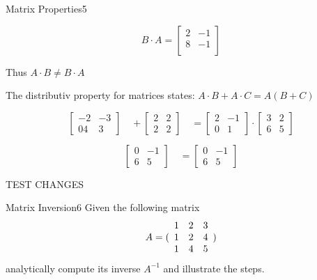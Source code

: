 \begin{questions}
\begin{question}{Matrix Properties}{5}
\begin{answer}
\begin{equation}
B \cdot A = \begin{bmatrix}
2 & -1 \\
8 & -1\\
\end{bmatrix}
\end{equation}

Thus $A \cdot B \neq B \cdot A$

The distributiv property for matrices states: $A\cdot B + A\cdot C = A (B+C)$ 


\[
\begin{bmatrix}
-2 & -3  \\
04 &  3 
\end{bmatrix}\quad
+
\begin{bmatrix}
2 & 2  \\
2 & 2 
\end{bmatrix}\quad
=
\begin{bmatrix}
2 & -1  \\
0 & 1 
\end{bmatrix}
\cdot
\begin{bmatrix}
3 & 2  \\
6 & 5
\end{bmatrix}
\]

\[
\begin{bmatrix}
0 & -1  \\
6 & 5 
\end{bmatrix}\quad
=
\begin{bmatrix}
0 & -1  \\
6 & 5
\end{bmatrix}
\]


TEST CHANGES

\end{answer}

\end{question}


\begin{question}{Matrix Inversion}{6}
Given the following matrix 
\begin{equation*}
     A = ( \begin{array}{c c c} 
     1 & 2 & 3 \\
     1 & 2 & 4 \\
     1 & 4 & 5 \end{array} )
\end{equation*}
analytically compute its inverse $ A^{-1}$ and illustrate the steps.


\end{question}
\end{questions}
